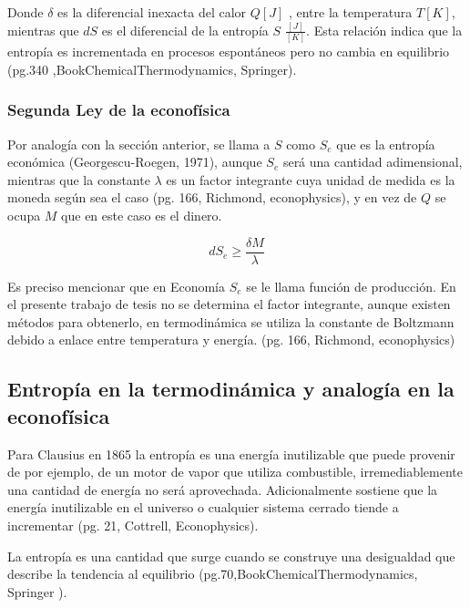 Donde $\delta$ es la diferencial inexacta del calor $Q [J]$ , entre la temperatura $T [K]$, mientras que $dS$ es el diferencial de la entropía $S$ $\frac{[J]}{[K]}$. Esta relación indica que la entropía es incrementada en procesos espontáneos pero no cambia en equilibrio (pg.340 ,BookChemicalThermodynamics, Springer).

\subsubsection{Segunda Ley de la econofísica} 

Por analogía con la sección anterior, se llama a $S$ como $S_e$ que es la entropía económica (Georgescu-Roegen, 1971), aunque $S_e$ será una cantidad adimensional, mientras que la constante $\lambda$ es un factor integrante cuya unidad de medida es la moneda según sea el caso (pg. 166, Richmond, econophysics), y en vez de $Q$ se ocupa $M$ que en este caso es el dinero. 

\begin{equation}
dS_e \geqslant \frac{\delta M}{\lambda}
\end{equation}

Es preciso mencionar que en Economía $S_e$ se le llama función de producción. En el presente trabajo de tesis no se determina el factor integrante, aunque existen métodos para obtenerlo, en termodinámica se utiliza la constante de Boltzmann debido a enlace entre temperatura y energía. (pg. 166, Richmond, econophysics)

\subsection{Entropía en la termodinámica y analogía en la econof\'isica} 

Para Clausius en 1865 la entropía es una energía inutilizable que puede provenir de por ejemplo, de un motor de vapor que utiliza combustible, irremediablemente una cantidad de energía no será aprovechada. Adicionalmente sostiene que la energía inutilizable en el universo o cualquier sistema cerrado tiende a incrementar (pg. 21, Cottrell, Econophysics). 

La entropía es una cantidad que surge cuando se construye una desigualdad que describe la tendencia al equilibrio (pg.70,BookChemicalThermodynamics, Springer ).


